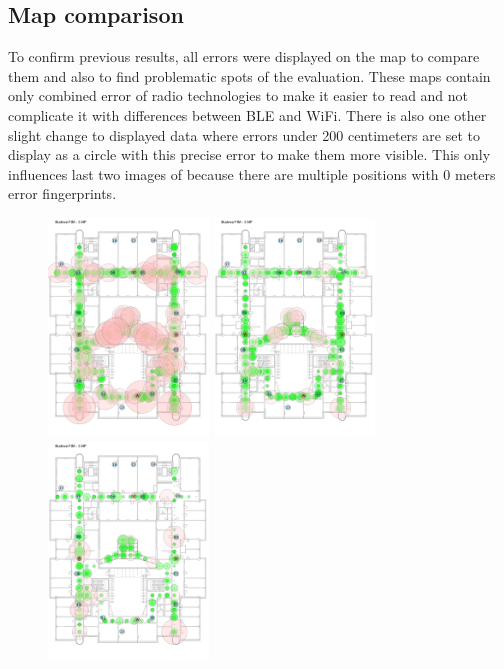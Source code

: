 \subsection{Map comparison}\label{sec:MapComparison}
To confirm previous results, all errors were displayed on the map to compare them and also to find problematic spots of the evaluation. These maps contain only combined error of radio technologies to make it easier to read and not complicate it with differences between BLE and WiFi. There is also one other slight change to displayed data where errors under 200 centimeters are set to display as a circle with this precise error to make them more visible. This only influences last two images of  because there are multiple positions with 0 meters error fingerprints.

\begin{figure}[h!]
	\begin{centering}
		\includegraphics[width=0.38\textwidth]{img/combined_error_classic}
		\hspace{0.3cm}
		\includegraphics[width=0.38\textwidth]{img/combined_error_multiple_f}
		\includegraphics[width=0.38\textwidth]{img/combined_error_f_combination}

\end{centering}
\end{figure}
